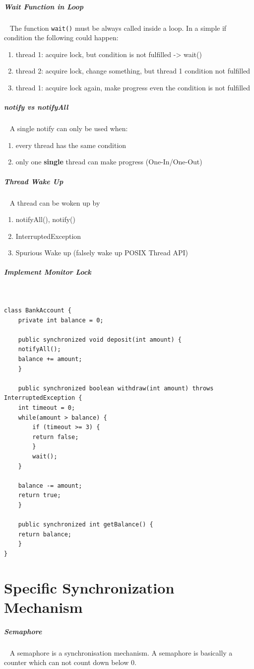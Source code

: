 \documentclass[11pt,twoside,landscape]{article}
\begin{document}
\begin{multicols}{3}
\subparagraph{Wait Function in Loop} \
\label{sec:orgab7b6c3}
The function \texttt{wait()} must be always called inside a loop.
In a simple if condition the following could happen:

\begin{enumerate}
\item thread 1: acquire lock, but condition is not fulfilled -> wait()
\item thread 2: acquire lock, change something, but thread 1 condition not fulfilled
\item thread 1: acquire lock again, make progress even the condition is not fulfilled
\end{enumerate}

\subparagraph{notify vs notifyAll} \
\label{sec:org522f619}
A single notify can only be used when:
\begin{enumerate}
\item every thread has the same condition
\item only one \textbf{single} thread can make progress (One-In/One-Out)
\end{enumerate}

\subparagraph{Thread Wake Up} \
\label{sec:orge76bd2a}
A thread can be woken up by
\begin{enumerate}
\item notifyAll(), notify()
\item InterruptedException
\item Spurious Wake up (falsely wake up POSIX Thread API)
\end{enumerate}

\subparagraph{Implement Monitor Lock} \
\label{sec:org54055da}

\lstset{language=java,label= ,caption= ,captionpos=b,numbers=none}
\begin{lstlisting}
class BankAccount {
    private int balance = 0;

    public synchronized void deposit(int amount) {
	notifyAll();
	balance += amount;
    }

    public synchronized boolean withdraw(int amount) throws InterruptedException {
	int timeout = 0;
	while(amount > balance) {
	    if (timeout >= 3) {
		return false;
	    }
	    wait();
	}

	balance -= amount;
	return true;
    }

    public synchronized int getBalance() {
	return balance;
    }
}

\end{lstlisting}
\section{Specific Synchronization Mechanism}
\label{sec:orge8f475b}
\subparagraph{Semaphore} \
\label{sec:org4cfb27c}
A semaphore is a synchronisation mechanism.
A semaphore is basically a counter which can not count down below 0.


\end{multicols}
\end{document}
